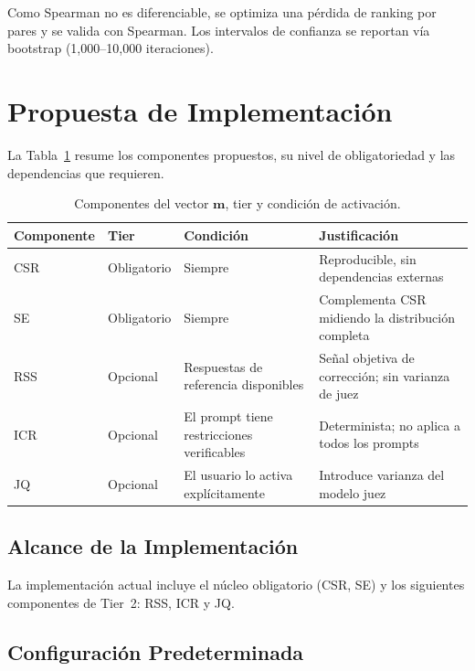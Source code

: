 \documentclass[11pt,a4paper]{article}
\begin{document}
Como Spearman no es diferenciable, se optimiza una pérdida de ranking por pares y se valida con Spearman. Los intervalos de confianza se reportan vía bootstrap (1{,}000--10{,}000 iteraciones).

\section{Propuesta de Implementación}

La Tabla~\ref{tab:components} resume los componentes propuestos, su nivel de obligatoriedad y las dependencias que requieren.

\begin{table}[h]
\centering
\caption{Componentes del vector $\mathbf{m}$, tier y condición de activación.}
\label{tab:components}
\begin{tabular}{lllp{5cm}}
\toprule
Componente & Tier & Condición & Justificación \\
\midrule
CSR & Obligatorio & Siempre & Reproducible, sin dependencias externas \\
SE  & Obligatorio & Siempre & Complementa CSR midiendo la distribución completa \\
RSS & Opcional & Respuestas de referencia disponibles & Señal objetiva de corrección; sin varianza de juez \\
ICR & Opcional & El prompt tiene restricciones verificables & Determinista; no aplica a todos los prompts \\
JQ  & Opcional & El usuario lo activa explícitamente & Introduce varianza del modelo juez \\
\bottomrule
\end{tabular}
\end{table}

\subsection{Alcance de la Implementación}

La implementación actual incluye el núcleo obligatorio (CSR, SE) y los siguientes componentes de Tier~2: RSS, ICR y JQ.

\subsection{Configuración Predeterminada}
\end{document}
